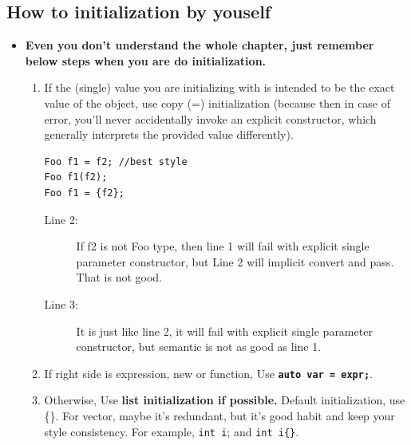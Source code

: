 \documentclass[a4paper,11pt,twoside]{book}
\begin{document}
\subsection{How to initialization by youself}

\begin{itemize}
		\item \textbf{Even you don't understand the whole chapter, just remember below steps when you are do initialization.}
	\begin{enumerate}
		\item  If the (single) value you are initializing with is intended to be the exact value of the object, use copy (=) initialization (because then in case of error, you'll never accidentally invoke an explicit constructor, which generally interprets the provided value differently).
\begin{lstlisting}
Foo f1 = f2; //best style
Foo f1(f2);  
Foo f1 = {f2}; 
\end{lstlisting}		
		\begin{description}
			\item[Line 2:] If f2 is not Foo type, then line 1 will fail with explicit single parameter constructor, but Line 2 will implicit convert and pass. That is not good.
			
			\item[Line 3:] It is just like line 2, it will fail with explicit single parameter constructor, but semantic is not as good as line 1.
		\end{description}
		\item If right side is expression, new or function, Use \textbf{\texttt{auto var = expr;}}. 
		
		\item Otherwise, Use \textbf{list initialization if possible.}   Default initialization, use \{\}. For vector, maybe it's redundant, but it's good habit and keep your style consistency. For example, \texttt{int i}; and \texttt{int i\{\}}.
		

\end{enumerate}
\end{itemize}
\end{document}
